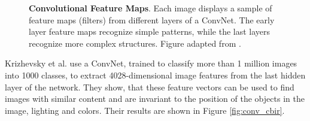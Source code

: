\documentclass[12pt]{report}
\begin{document}
\begin{figure}[h]
\centering
{}\hspace{.3cm}
\hspace{.3cm}
\caption{\label{fig:conv_feats} \textbf{Convolutional Feature Maps}. Each image displays a sample of feature maps (filters) from different layers of a ConvNet. The early layer feature maps recognize simple patterns, while the last layers recognize more complex structures. Figure adapted from \cite{gandhi_build_2018}.}
\end{figure}


Krizhevsky et al.\cite{NIPS2012_4824} use a ConvNet, trained to classify more than 1 million images into 1000 classes, to extract 4028-dimensional image features from the last hidden layer of the network. They show, that these feature vectors can be used to find images with similar content and are invariant to the position of the objects in the image, lighting and colors. Their results are shown in Figure \ref{fig:conv_cbir}.
\end{document}
